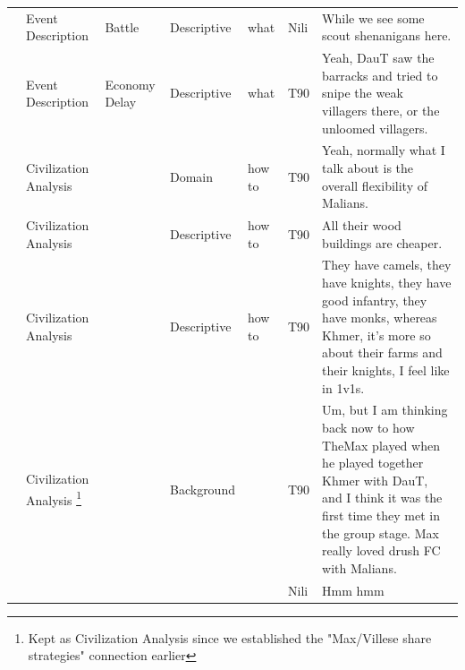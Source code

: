 {\begin{longtable}{@{}>{\theAppRow}r|L{2.3cm}L{2.2cm}L{1.4cm}L{2.2cm}L{0.5cm}U{5.6cm}@{}}
    & Event Description     & Battle               & Descriptive   & what              & Nili    & While we see some scout shenanigans here.                                                                                                                                                                                \\
    & Event Description     & Economy Delay        & Descriptive   & what              & T90     & Yeah, DauT saw the barracks and tried to snipe the weak villagers there, or the unloomed villagers.                                                                                                                      \\
    & Civilization Analysis &                      & Domain      & how to            & T90     & Yeah, normally what I talk about is the overall flexibility of Malians.                                                                                                                                                  \\
    & Civilization Analysis &                      & Descriptive   & how to            & T90     & All their wood buildings are cheaper.                                                                                                                                                                                    \\
    & Civilization Analysis &                      & Descriptive   & how to            & T90     & They have camels, they have knights, they have good infantry, they have monks, whereas Khmer, it's more so about their farms and their knights, I feel like in 1v1s.                                                     \\
    & Civilization Analysis \footnote{Kept as Civilization Analysis since we established the "Max/Villese share strategies" connection earlier} &                      & Background  &                   & T90     & Um, but I am thinking back now to how TheMax played when he played together Khmer with DauT, and I think it was the first time they met in the group stage. Max really loved drush FC with Malians.                       \\
    &                       &                      &             &                   & Nili    & Hmm hmm                                                                                                                                                                                                                  \\

\end{longtable}}
